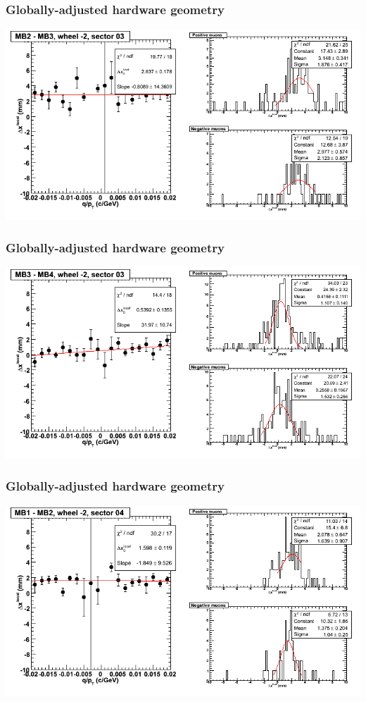 \documentclass[compress]{beamer}
\begin{document}
\begin{frame}
\frametitle{Globally-adjusted hardware geometry}
\includegraphics[width=\linewidth]{NOV4_segdiffs_HW/dt13_resid_A_03_23.png}
\end{frame}

\begin{frame}
\frametitle{Globally-adjusted hardware geometry}
\includegraphics[width=\linewidth]{NOV4_segdiffs_HW/dt13_resid_A_03_34.png}
\end{frame}

\begin{frame}
\frametitle{Globally-adjusted hardware geometry}
\includegraphics[width=\linewidth]{NOV4_segdiffs_HW/dt13_resid_A_04_12.png}
\end{frame}
\end{document}
